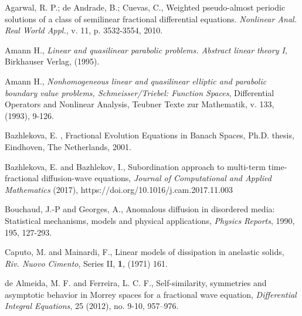 \documentclass[12pt,reqno]{amsart}
\begin{document}
			\begin{thebibliography}{}
				
				 Agarwal, R. P.; de Andrade, B.; Cuevas, C., Weighted pseudo-almost periodic solutions of a class of semilinear fractional differential equations. {\it Nonlinear Anal. Real World Appl.}, v. 11, p. 3532-3554, 2010.
				
				
				
				
				
				 Amann H., {\it Linear and quasilinear parabolic problems. Abstract linear theory I}, Birkhauser Verlag, (1995).
				
				 Amann H., {\it Nonhomogeneous linear and quasilinear elliptic and parabolic boundary value problems, Schmeisser/Triebel: Function Spaces}, Differential Operators and Nonlinear Analysis, Teubner Texte zur Mathematik, v. 133, (1993), 9-126.
				
				 Bazhlekova, E. , Fractional Evolution Equations in Banach Spaces, Ph.D. thesis, Eindhoven, The Netherlands, 2001.	
				
				 Bazhlekova, E. and Bazhlekov, I., Subordination approach to multi-term time-fractional diffusion-wave equations, {\it Journal of Computational and Applied Mathematics} (2017), https://doi.org/10.1016/j.cam.2017.11.003
				
				
				 Bouchaud,  J.-P and Georges, A., Anomalous diffusion in disordered media: Statistical mechanisms, models and physical applications, {\it Physics Reports}, 1990, 195, 127-293.
				
				   Caputo, M. and Mainardi, F.,   Linear models of dissipation in anelastic solids,  {\it Riv. Nuovo Cimento}, Series II, {\bf 1}, (1971) 161.
				
					de Almeida, M. F. and Ferreira, L. C. F., Self-similarity, symmetries and asymptotic behavior in Morrey spaces for a fractional wave equation, {\it Differential Integral Equations}, 25 (2012), no. 9-10, 957–976.
				

\end{thebibliography}
\end{document}
